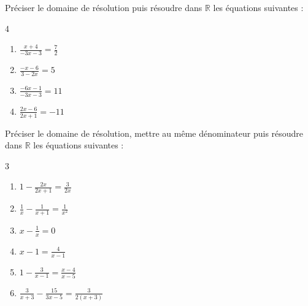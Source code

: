 \documentclass[main.tex]{subfiles}
\begin{document}
\begin{exercise}  \label{chapter08:exercice:equationrationnelles02b}  
Préciser le domaine de résolution puis résoudre  dans $\mathbb{R}$ les équations suivantes : 
\begin{multicols}{4}
\begin{enumerate}[label={$(E_\arabic*)$\rule{0pt}{2em}},leftmargin=*] 
\item $\frac{x+4}{-3x-3} =\frac{7}{2}$ %
\item $\frac{-x-6}{3-2x} =5$ 
\item $\frac{-6x-1}{-3x-3}=11$
\item $\frac{2x-6}{2x+1}=-11$
\end{enumerate}
\end{multicols}  
\end{exercise} 
 

\begin{exercise}   \label{chapter08:exercice:equationrationnelles03} 
Préciser le domaine de résolution, mettre au même dénominateur puis résoudre  dans $\mathbb{R}$ les équations suivantes  : 
\begin{multicols}{3}
\begin{enumerate}[label={$(E_\arabic*)$\rule{0pt}{2em}},leftmargin=*]
\item $1-\frac{2x}{2x+1}=\frac{3}{2x}$ 
\item $\frac{1}{x}-\frac{1}{x+1}=\frac{1}{x^2}$  
\item$x-\frac{1}{x}=0$ 
\item  $x-1=\frac{4}{x-1}$  
\item $1-\frac{3}{x-1}= \frac{x-4}{x-5} $ 
\item $\frac{3}{x+3}-\frac{15}{3x-5} =\frac{3}{2(x+3)}$ 
\end{enumerate}
\end{multicols}   
\end{exercise}









\newpage 
\end{document}
